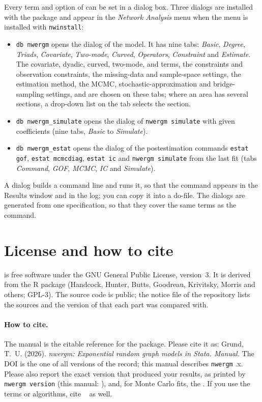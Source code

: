 Every term and option of \nwergm{} can be set in a dialog box. Three dialogs are installed with the package and appear in the \emph{Network Analysis} menu when the menu is installed with \texttt{nwinstall}:
\begin{itemize}[nosep]
  \item \texttt{db nwergm} opens the dialog of the model. It has nine tabs: \emph{Basic}, \emph{Degree}, \emph{Triads}, \emph{Covariate}, \emph{Two-mode}, \emph{Curved}, \emph{Operators}, \emph{Constraint} and \emph{Estimate}. The covariate, dyadic, curved, two-mode,  and  terms, the constraints and observation constraints, the missing-data and sample-space settings, the estimation method, the MCMC, stochastic-approximation and bridge-sampling settings,  and  are chosen on these tabs; where an area has several sections, a drop-down list on the tab selects the section.
  \item \texttt{db nwergm\_simulate} opens the dialog of \texttt{nwergm simulate} with given coefficients (nine tabs, \emph{Basic} to \emph{Simulate}).
  \item \texttt{db nwergm\_estat} opens the dialog of the postestimation commands \texttt{estat gof}, \texttt{estat mcmcdiag}, \texttt{estat ic} and \texttt{nwergm simulate} from the last fit (tabs \emph{Command}, \emph{GOF}, \emph{MCMC}, \emph{IC} and \emph{Simulate}).
\end{itemize}
A dialog builds a command line and runs it, so that the command appears in the Results window and in the log; you can copy it into a do-file. The dialogs are generated from one specification, so that they cover the same terms as the command.

\section{License and how to cite}

\nwergm{} is free software under the GNU General Public License, version~3. It is derived from the R package \ergm{} (Handcock, Hunter, Butts, Goodreau, Krivitsky, Morris and others; GPL-3). The source code is public; the notice file of the repository lists the sources and the version of \ergm{} that each part was compared with.

\paragraph{How to cite.} The manual is the citable reference for the package. Please cite it as: Grund, T.~U. (2026). \emph{nwergm: Exponential random graph models in Stata. Manual.}\citedoi{} The DOI is the one of all versions of the record; this manual describes \texttt{nwergm} \manualseries.x. Please also report the exact version that produced your results, as printed by \texttt{nwergm version} (this manual: \pkgversion), and, for Monte Carlo fits, the . If you use the terms or algorithms, cite \ergm{}~\cite{hunter2008jss} as well.

